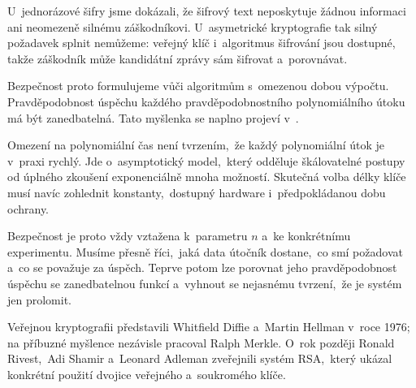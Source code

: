 U~jednorázové šifry jsme dokázali, že šifrový text neposkytuje žádnou informaci ani neomezeně silnému záškodníkovi. U~asymetrické kryptografie tak silný požadavek splnit nemůžeme: veřejný klíč i~algoritmus šifrování jsou dostupné, takže záškodník může kandidátní zprávy sám šifrovat a~porovnávat.

Bezpečnost proto formulujeme vůči algoritmům s~omezenou dobou výpočtu. Pravděpodobnost úspěchu každého pravděpodobnostního polynomiálního útoku má být zanedbatelná. Tato myšlenka se naplno projeví v~.

Omezení na polynomiální čas není tvrzením,~že každý polynomiální útok je v~praxi rychlý. Jde o~asymptotický model,~který odděluje škálovatelné postupy od úplného zkoušení exponenciálně mnoha možností. Skutečná volba délky klíče musí navíc zohlednit konstanty,~dostupný hardware i~předpokládanou dobu ochrany.

Bezpečnost je proto vždy vztažena k~parametru $n$ a~ke konkrétnímu experimentu. Musíme přesně říci,~jaká data útočník dostane,~co smí požadovat a~co se považuje za úspěch. Teprve potom lze porovnat jeho pravděpodobnost úspěchu se zanedbatelnou funkcí a~vyhnout se nejasnému tvrzení,~že je systém jen  prolomit.

\begin{remark}
    Veřejnou kryptografii představili Whitfield Diffie a~Martin Hellman v~roce 1976; na příbuzné myšlence nezávisle pracoval Ralph Merkle. O~rok později Ronald Rivest,~Adi Shamir a~Leonard Adleman zveřejnili systém RSA,~který ukázal konkrétní použití dvojice veřejného a~soukromého klíče.
\end{remark}

